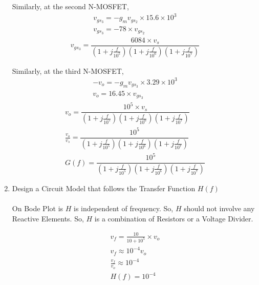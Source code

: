 \begin{enumerate}[label=\thesubsection.\arabic*.,ref=\thesubsection.\theenumi]
Similarly, at the second N-MOSFET,
\begin{align}
v_{gs_{3}} = -g_{m}v_{gs_{2}}\times 15.6\times 10^{3}\\
v_{gs_{3}} = -78 \times v_{gs_{2}}
\end{align}
\begin{align}
v_{gs_{3}} = \dfrac{6084\times v_{s}}{\left(1+j\frac{f}{10^{5}}\right)\left(1+j\frac{f}{10^{6}}\right)\left(1+j\frac{f}{10^{7}}\right)}
\end{align}

Similarly, at the third N-MOSFET,
\begin{align}
-v_{o} = -g_{m}v_{gs_{3}}\times 3.29\times 10^{3}\\
v_{o} = 16.45 \times v_{gs_{3}}
\end{align}
\begin{align}
v_{o} = \dfrac{10^{5}\times v_{s}}{\left(1+j\frac{f}{10^{5}}\right)\left(1+j\frac{f}{10^{6}}\right)\left(1+j\frac{f}{10^{7}}\right)}\\
\frac{v_{o}}{v_{s}} = \dfrac{10^{5}}{\left(1+j\frac{f}{10^{5}}\right)\left(1+j\frac{f}{10^{6}}\right)\left(1+j\frac{f}{10^{7}}\right)}\\
G(f) = \dfrac{10^{5}}{\left(1+j\frac{f}{10^{5}}\right)\left(1+j\frac{f}{10^{6}}\right)\left(1+j\frac{f}{10^{7}}\right)}
\end{align}

\item Design a Circuit Model that follows the Transfer Function $H(f)$\\
\solution\\
On Bode Plot is $H$ is independent of frequency. So, $H$  should not involve any Reactive Elements. So, $H$ is a combination of Resistors or a Voltage Divider.
\begin{figure}[ht!]
	\begin{center}
		\resizebox{\columnwidth/2}{!}{}
	\end{center}
	\caption{}
	\label{fig:Circuit}
\end{figure}

\begin{align}
v_{f} = \frac{10}{10 + 10^{5}} \times v_{o}\\
v_{f} \approx 10^{-4} v_{o}\\
\frac{v_{f}}{v_{o}} \approx 10^{-4}\\
H(f) = 10^{-4}
\end{align}

\end{enumerate}
